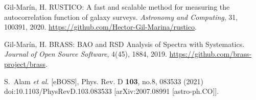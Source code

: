 \begin{thebibliography}{999}
 Gil-Marín, H. RUSTICO: A fast and scalable method for measuring the autocorrelation function of galaxy surveys. \textit{Astronomy and Computing}, 31, 100391, 2020. \url{https://github.com/Hector-Gil-Marina/rustico}.

 Gil-Marín, H. BRASS: BAO and RSD Analysis of Spectra with Systematics. \textit{Journal of Open Source Software}, 4(45), 1884, 2019. \url{https://github.com/brass-project/brass}.

S.~Alam \textit{et al.} [eBOSS],
Phys. Rev. D \textbf{103}, no.8, 083533 (2021)
doi:10.1103/PhysRevD.103.083533
[arXiv:2007.08991 [astro-ph.CO]].

\end{thebibliography}
